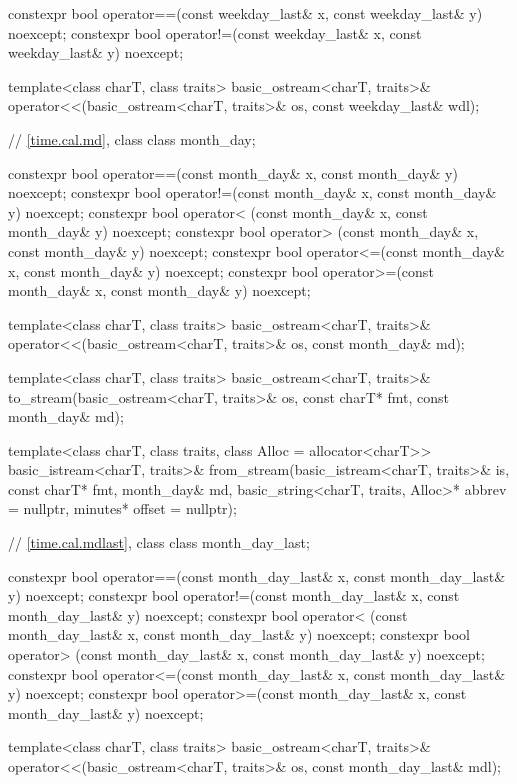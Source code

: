 \begin{codeblock}
{{    constexpr bool operator==(const weekday_last& x, const weekday_last& y) noexcept;
    constexpr bool operator!=(const weekday_last& x, const weekday_last& y) noexcept;

    template<class charT, class traits>
      basic_ostream<charT, traits>&
        operator<<(basic_ostream<charT, traits>& os, const weekday_last& wdl);

    // \ref{time.cal.md}, class 
    class month_day;

    constexpr bool operator==(const month_day& x, const month_day& y) noexcept;
    constexpr bool operator!=(const month_day& x, const month_day& y) noexcept;
    constexpr bool operator< (const month_day& x, const month_day& y) noexcept;
    constexpr bool operator> (const month_day& x, const month_day& y) noexcept;
    constexpr bool operator<=(const month_day& x, const month_day& y) noexcept;
    constexpr bool operator>=(const month_day& x, const month_day& y) noexcept;

    template<class charT, class traits>
      basic_ostream<charT, traits>&
        operator<<(basic_ostream<charT, traits>& os, const month_day& md);

    template<class charT, class traits>
      basic_ostream<charT, traits>&
        to_stream(basic_ostream<charT, traits>& os, const charT* fmt, const month_day& md);

    template<class charT, class traits, class Alloc = allocator<charT>>
      basic_istream<charT, traits>&
        from_stream(basic_istream<charT, traits>& is, const charT* fmt,
                    month_day& md, basic_string<charT, traits, Alloc>* abbrev = nullptr,
                    minutes* offset = nullptr);

    // \ref{time.cal.mdlast}, class 
    class month_day_last;

    constexpr bool operator==(const month_day_last& x, const month_day_last& y) noexcept;
    constexpr bool operator!=(const month_day_last& x, const month_day_last& y) noexcept;
    constexpr bool operator< (const month_day_last& x, const month_day_last& y) noexcept;
    constexpr bool operator> (const month_day_last& x, const month_day_last& y) noexcept;
    constexpr bool operator<=(const month_day_last& x, const month_day_last& y) noexcept;
    constexpr bool operator>=(const month_day_last& x, const month_day_last& y) noexcept;

    template<class charT, class traits>
      basic_ostream<charT, traits>&
        operator<<(basic_ostream<charT, traits>& os, const month_day_last& mdl);

}}
\end{codeblock}
